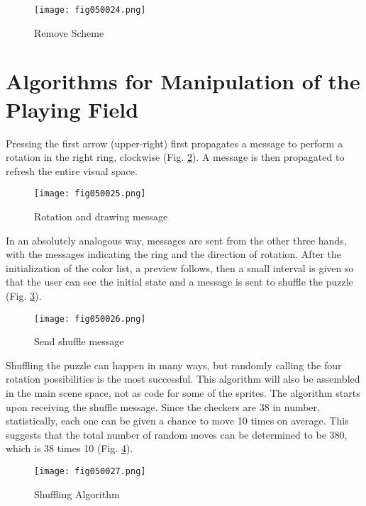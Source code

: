 \begin{figure}[H]
   \centering
   \texttt{[image: fig050024.png]}
   \caption{Remove Scheme}
\label{fig050024}
\end{figure}

\section{Algorithms for Manipulation of the Playing Field}

Pressing the first arrow (upper-right) first propagates a message to perform a rotation in the right ring, clockwise (Fig. \ref{fig050025}). A message is then propagated to refresh the entire visual space.

\begin{figure}[H]
   \centering
   \texttt{[image: fig050025.png]}
   \caption{Rotation and drawing message}
\label{fig050025}
\end{figure}

In an absolutely analogous way, messages are sent from the other three hands, with the messages indicating the ring and the direction of rotation. After the initialization of the color list, a preview follows, then a small interval is given so that the user can see the initial state and a message is sent to shuffle the puzzle (Fig. \ref{fig050026}).

\begin{figure}[H]
   \centering
   \texttt{[image: fig050026.png]}
   \caption{Send shuffle message}
\label{fig050026}
\end{figure}

Shuffling the puzzle can happen in many ways, but randomly calling the four rotation possibilities is the most successful. This algorithm will also be assembled in the main scene space, not as code for some of the sprites. The algorithm starts upon receiving the shuffle message. Since the checkers are 38 in number, statistically, each one can be given a chance to move 10 times on average. This suggests that the total number of random moves can be determined to be 380, which is 38 times 10 (Fig. \ref{fig050027}).

\begin{figure}[H]
   \centering
   \texttt{[image: fig050027.png]}
   \caption{Shuffling Algorithm}
\label{fig050027}
\end{figure}

